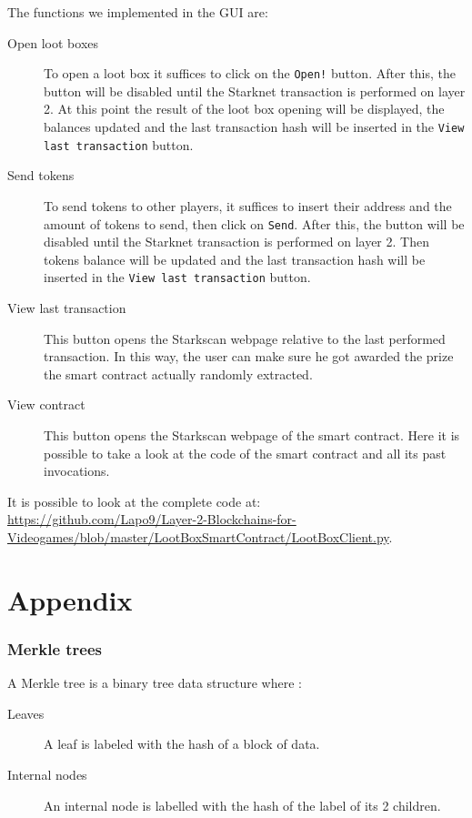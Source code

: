 \documentclass[12pt]{article}
\begin{document}
The functions we implemented in the GUI are:
\begin{description}
    \item[Open loot boxes] To open a loot box it suffices to click on the \verb|Open!| button. After this, the button will be disabled until the Starknet transaction is performed on layer 2. At this point the result of the loot box opening will be displayed, the balances updated and the last transaction hash will be inserted in the \verb|View last transaction| button.
    \item[Send tokens] To send tokens to other players, it suffices to insert their address and the amount of tokens to send, then click on \verb|Send|. After this, the button will be disabled until the Starknet transaction is performed on layer 2. Then tokens balance will be updated and the last transaction hash will be inserted in the \verb|View last transaction| button.
    \item[View last transaction] This button opens the Starkscan webpage relative to the last performed transaction. In this way, the user can make sure he got awarded the prize the smart contract actually randomly extracted.
    \item[View contract] This button opens the Starkscan webpage of the smart contract. Here it is possible to take a look at the code of the smart contract and all its past invocations.
\end{description}

It is possible to look at the complete code at:\\\url{https://github.com/Lapo9/Layer-2-Blockchains-for-Videogames/blob/master/LootBoxSmartContract/LootBoxClient.py}.

\newpage
\part{Appendix} \label{part:appendix}
\section{Merkle trees} \label{section:merkle_trees}
A Merkle tree is a binary tree data structure where \cite{ethereum_merkle_trees}:
\begin{description}
    \item[Leaves] A leaf is labeled with the hash of a block of data.
    \item[Internal nodes] An internal node is labelled with the hash of the label of its 2 children.
\end{description}
\end{document}
